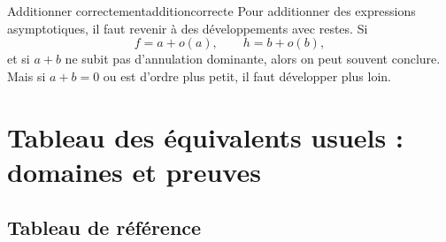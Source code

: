 \documentclass[11pt,a4paper]{article}
\begin{document}
\begin{methodbox}{Additionner correctement}{additioncorrecte}
Pour additionner des expressions asymptotiques, il faut revenir à des développements avec restes. Si
\[
  f=a+o(a),\qquad h=b+o(b),
\]
et si $a+b$ ne subit pas d'annulation dominante, alors on peut souvent conclure. Mais si $a+b=0$ ou est d'ordre plus petit, il faut développer plus loin.
\end{methodbox}

\section{Tableau des équivalents usuels : domaines et preuves}

\subsection{Tableau de référence}
\end{document}
